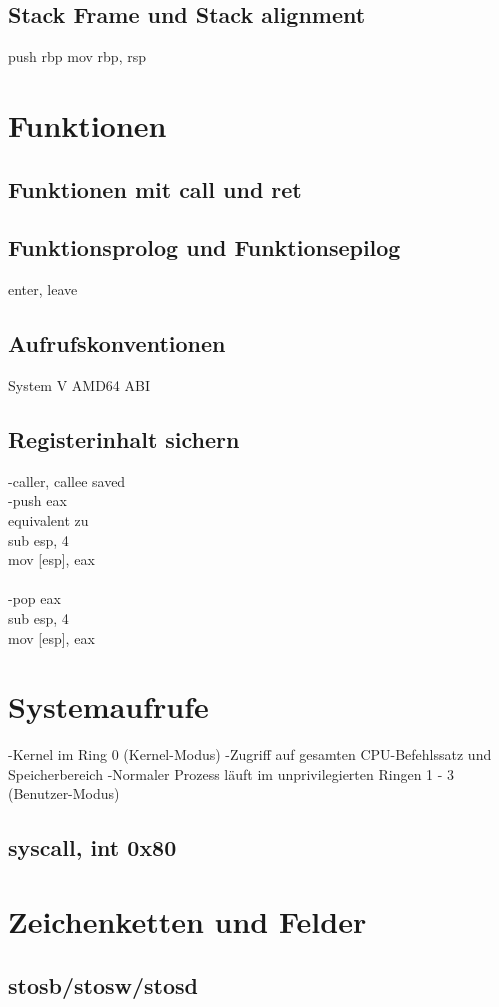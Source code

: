 \documentclass[12pt, a4paper, utf8]{book}
\begin{document}
\section{Stack Frame und Stack alignment}
    push rbp
    mov rbp, rsp
\chapter{Funktionen}
\section{Funktionen mit call und ret}
\section{Funktionsprolog und Funktionsepilog}
    enter, leave
\section{Aufrufskonventionen}
    System V AMD64 ABI
\section{Registerinhalt sichern}
    -caller, callee saved\\
    -push eax\\
     equivalent zu\\
     sub esp, 4\\
     mov [esp], eax\\
    \\
    -pop eax\\
        sub esp, 4\\
        mov [esp], eax\\
\chapter{Systemaufrufe}
    -Kernel im Ring 0 (Kernel-Modus)
    -Zugriff auf gesamten CPU-Befehlssatz und Speicherbereich
    -Normaler Prozess läuft im unprivilegierten Ringen 1 - 3 (Benutzer-Modus)
\section{syscall, int 0x80}
\chapter{Zeichenketten und Felder}
\section{stosb/stosw/stosd}
\end{document}

